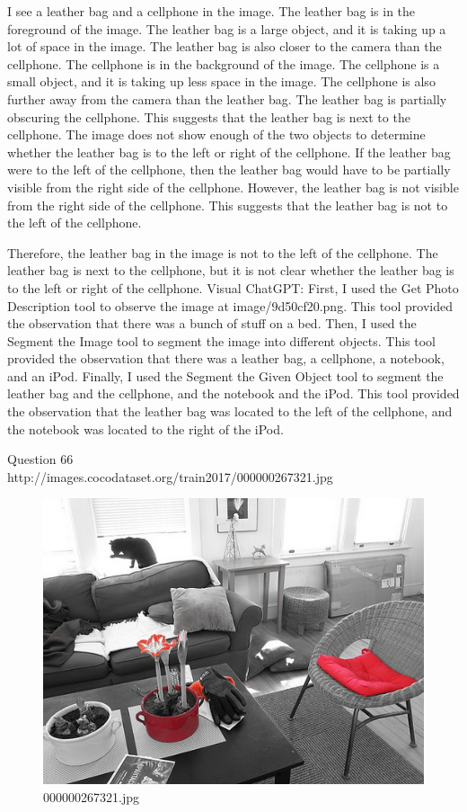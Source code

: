 \begin{enumerate}
    I see a leather bag and a cellphone in the image.
    The leather bag is in the foreground of the image. The leather bag is a large object, and it is taking up a lot of space in the image. The leather bag is also closer to the camera than the cellphone.
    The cellphone is in the background of the image. The cellphone is a small object, and it is taking up less space in the image. The cellphone is also further away from the camera than the leather bag.
    The leather bag is partially obscuring the cellphone. This suggests that the leather bag is next to the cellphone.
    The image does not show enough of the two objects to determine whether the leather bag is to the left or right of the cellphone.
    If the leather bag were to the left of the cellphone, then the leather bag would have to be partially visible from the right side of the cellphone. However, the leather bag is not visible from the right side of the cellphone. This suggests that the leather bag is not to the left of the cellphone.
    
    Therefore, the leather bag in the image is not to the left of the cellphone. The leather bag is next to the cellphone, but it is not clear whether the leather bag is to the left or right of the cellphone.   
    \subitem Visual ChatGPT: First, I used the Get Photo Description tool to observe the image at image/9d50cf20.png. This tool provided the observation that there was a bunch of stuff on a bed. Then, I used the Segment the Image tool to segment the image into different objects. This tool provided the observation that there was a leather bag, a cellphone, a notebook, and an iPod. Finally, I used the Segment the Given Object tool to segment the leather bag and the cellphone, and the notebook and the iPod. This tool provided the observation that the leather bag was located to the left of the cellphone, and the notebook was located to the right of the iPod.
\end{enumerate}
Question 66\\
http://images.cocodataset.org/train2017/000000267321.jpg
\begin{figure}[h]
    \centering
    \includegraphics[width=0.8\linewidth]{../image set/hard/000000267321.jpg}
    \caption{000000267321.jpg}
\end{figure}
